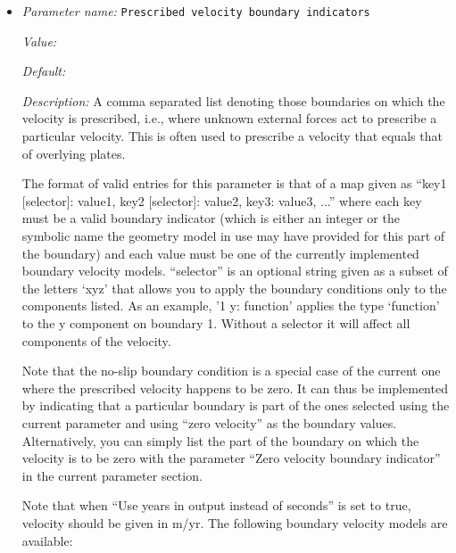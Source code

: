 \begin{itemize}
\item {\it Parameter name:} {\tt Prescribed velocity boundary indicators}
\label{parameters:Boundary velocity model/Prescribed velocity boundary indicators}
\label{parameters:Boundary_20velocity_20model/Prescribed_20velocity_20boundary_20indicators}


{\it Value:} 


{\it Default:} 


{\it Description:} A comma separated list denoting those boundaries on which the velocity is prescribed, i.e., where unknown external forces act to prescribe a particular velocity. This is often used to prescribe a velocity that equals that of overlying plates.

The format of valid entries for this parameter is that of a map given as ``key1 [selector]: value1, key2 [selector]: value2, key3: value3, ...'' where each key must be a valid boundary indicator (which is either an integer or the symbolic name the geometry model in use may have provided for this part of the boundary) and each value must be one of the currently implemented boundary velocity models. ``selector'' is an optional string given as a subset of the letters `xyz' that allows you to apply the boundary conditions only to the components listed. As an example, '1 y: function' applies the type `function' to the y component on boundary 1. Without a selector it will affect all components of the velocity.

Note that the no-slip boundary condition is a special case of the current one where the prescribed velocity happens to be zero. It can thus be implemented by indicating that a particular boundary is part of the ones selected using the current parameter and using ``zero velocity'' as the boundary values. Alternatively, you can simply list the part of the boundary on which the velocity is to be zero with the parameter ``Zero velocity boundary indicator'' in the current parameter section.

Note that when ``Use years in output instead of seconds'' is set to true, velocity should be given in m/yr. The following boundary velocity models are available:


\end{itemize}
